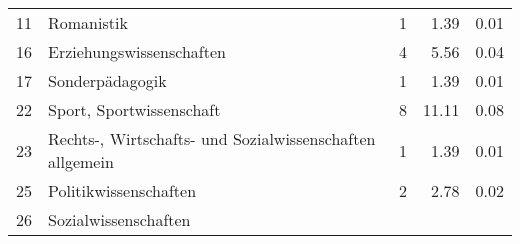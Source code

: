 \begin{longtable}{lXrrr}
     11 &
     \multicolumn{1}{X}{ Romanistik   } &


       \num{1} &
       \num[round-mode=places,round-precision=2]{1.39} &
         \num[round-mode=places,round-precision=2]{0.01} \\

     16 &
     \multicolumn{1}{X}{ Erziehungswissenschaften   } &


       \num{4} &
       \num[round-mode=places,round-precision=2]{5.56} &
         \num[round-mode=places,round-precision=2]{0.04} \\

     17 &
     \multicolumn{1}{X}{ Sonderpädagogik   } &


       \num{1} &
       \num[round-mode=places,round-precision=2]{1.39} &
         \num[round-mode=places,round-precision=2]{0.01} \\

     22 &
     \multicolumn{1}{X}{ Sport, Sportwissenschaft   } &


       \num{8} &
       \num[round-mode=places,round-precision=2]{11.11} &
         \num[round-mode=places,round-precision=2]{0.08} \\

     23 &
     \multicolumn{1}{X}{ Rechts-, Wirtschafts- und Sozialwissenschaften allgemein   } &


       \num{1} &
       \num[round-mode=places,round-precision=2]{1.39} &
         \num[round-mode=places,round-precision=2]{0.01} \\

     25 &
     \multicolumn{1}{X}{ Politikwissenschaften   } &


       \num{2} &
       \num[round-mode=places,round-precision=2]{2.78} &
         \num[round-mode=places,round-precision=2]{0.02} \\

     26 &
     \multicolumn{1}{X}{ Sozialwissenschaften   } &



\end{longtable}
